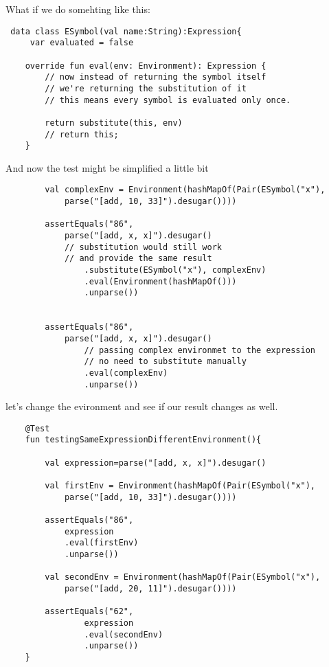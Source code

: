 \documentclass[11pt]{article}
\begin{document}
What if we do somehting like this:

\begin{verbatim}
 data class ESymbol(val name:String):Expression{
     var evaluated = false

    override fun eval(env: Environment): Expression {
        // now instead of returning the symbol itself
        // we're returning the substitution of it
        // this means every symbol is evaluated only once.

        return substitute(this, env)
        // return this;
    }

\end{verbatim}

And now the test might be simplified a little bit
\begin{verbatim}
        val complexEnv = Environment(hashMapOf(Pair(ESymbol("x"),
            parse("[add, 10, 33]").desugar())))

        assertEquals("86",
            parse("[add, x, x]").desugar()
            // substitution would still work
            // and provide the same result
                .substitute(ESymbol("x"), complexEnv)
                .eval(Environment(hashMapOf()))
                .unparse())


        assertEquals("86",
            parse("[add, x, x]").desugar()
                // passing complex environmet to the expression
                // no need to substitute manually
                .eval(complexEnv)
                .unparse())
\end{verbatim}


let's change the evironment and see if our result changes as well.

\begin{verbatim}
    @Test
    fun testingSameExpressionDifferentEnvironment(){

        val expression=parse("[add, x, x]").desugar()

        val firstEnv = Environment(hashMapOf(Pair(ESymbol("x"),
            parse("[add, 10, 33]").desugar())))

        assertEquals("86",
            expression
            .eval(firstEnv)
            .unparse())

        val secondEnv = Environment(hashMapOf(Pair(ESymbol("x"),
            parse("[add, 20, 11]").desugar())))

        assertEquals("62",
                expression
                .eval(secondEnv)
                .unparse())
    }
\end{verbatim}
\end{document}
